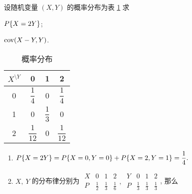 \begin{example}
    设随机变量 $(X,Y)$ 的概率分布为表 \ref{012140140130} 求\newline
    \begin{enumerate*}[label=(\arabic{*})]
        \item $P\qty{X=2Y}$;
        \item $\mathrm{cov}(X-Y,Y)$.
    \end{enumerate*}
\end{example}
\begin{solution}
    \begin{minipage}{0.3\linewidth}
        \begin{table}[H]
            \centering
            \caption*{概率分布}
            \label{012140140130}
            \begin{tabular}{c | c c c}
                $X^{\displaystyle\setminus Y}$ & 0               & 1              & 2               \\
                \midrule
                0                              & $\dfrac{1}{4}$  & 0              & $\dfrac{1}{4}$  \\[6pt]
                1                              & 0               & $\dfrac{1}{3}$ & 0               \\[6pt]
                2                              & $\dfrac{1}{12}$ & 0              & $\dfrac{1}{12}$
            \end{tabular}
        \end{table}
    \end{minipage}\hfill
    \begin{minipage}{0.69\linewidth}
        \begin{enumerate}[label=(\arabic{*})]
            \item $P\qty{X=2Y}=P\qty{X=0,Y=0}+P\qty{X=2,Y=1}=\dfrac{1}{4}.$
            \item $X,~Y$ 的分布律分别为 $\begin{array}{c|ccc}
                          X & 0           & 1           & 2           \\\hline
                          P & \frac{1}{2} & \frac{1}{3} & \frac{1}{6}
                      \end{array},~\begin{array}{c|ccc}
                          Y & 0           & 1           & 2           \\\hline
                          P & \frac{1}{3} & \frac{1}{3} & \frac{1}{3}
                      \end{array}$, 那么

\end{enumerate}
\end{minipage}
\end{solution}
